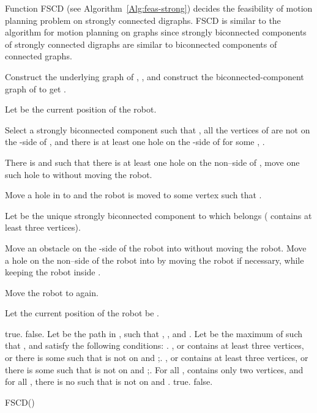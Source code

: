 \documentclass{article}
\begin{document}
Function FSCD (see Algorithm~\ref{Alg:feas-strong}) decides the
feasibility of motion planning problem on strongly connected
digraphs. FSCD is similar to the algorithm for motion planning on
graphs since strongly biconnected components of strongly connected
digraphs are similar to biconnected components of connected graphs.
\begin{algorithm}[ht]

\dontprintsemicolon \SetVline




Construct the underlying graph of , , and
construct the biconnected-component graph of  to get
.\;

{
Let  be the current position of the robot.\;
\eIf{}
{
Select a strongly biconnected component  such that , all the vertices of  are not on the -side of ,
    and there is at least one hole on the -side of  for some , .\;

{
There is  and  such that there is at least one hole on the non--side of ,
      move one such hole to  without moving the robot.
}

    Move a hole in  to  and the robot is moved to some vertex  such that .\;
}
{
Let  be the unique strongly biconnected component to which  belongs ( contains at least three vertices).\;

{
Move an obstacle on the -side of the robot into  without moving the robot.
}
Move a hole on the non--side of the robot into  by moving the robot if necessary, while keeping the robot inside .\;

    Move the robot to  again.
  }
}
Let the current position of the robot be .\;

{
{\Return true.}
{\Return false.}\;
}
{
Let  be the path in
  , such that , ,  and .\;
Let  be the maximum of  such that , and
   satisfy the following conditions:\;
. , or  contains at least three vertices, or
  there is some  such that  is not on  and ;. , or  contains at least three vertices, or there is
  some  such that  is not on  and ;. For all ,  contains only two vertices, and
  for all , there is no  such that  is
  not on  and .\;
\Indm {}
{\Return true.}
{\Return false.}\;
}
\caption{FSCD()\label{Alg:feas-strong}}
\end{algorithm}
\clearpage
\end{document}
